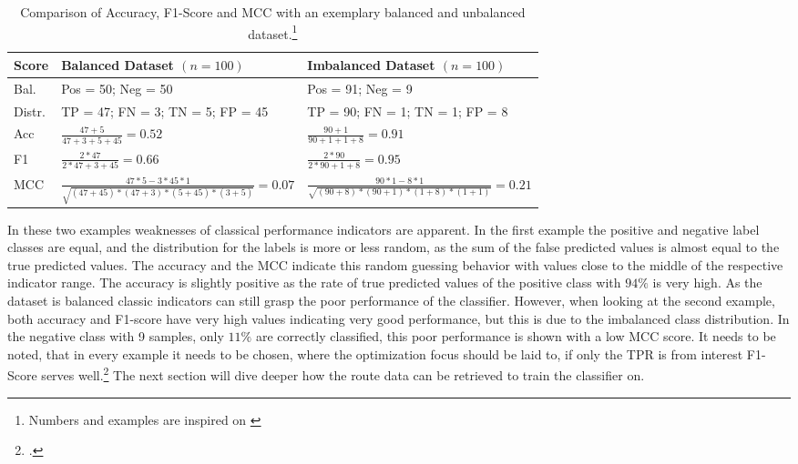 \begin{table}[ht]
    \centering
    \begin{tabular}{@{}P{0.1\textwidth}P{0.38\textwidth}P{0.38\textwidth}@{}}
        \toprule
        Score  & Balanced Dataset $(n = 100)$                                     & Imbalanced Dataset $(n = 100)$                               \\
        \midrule
        Bal.   & Pos = 50; Neg = 50                                               & Pos = 91; Neg = 9                                            \\
        \midrule
        Distr. & TP = 47; FN = 3; TN = 5; FP = 45                                 & TP = 90; FN = 1; TN = 1; FP = 8                              \\
        \midrule
        Acc    & $\frac{47 + 5}{47 + 3  + 5 + 45} = 0.52$                         & $\frac{90 + 1}{90 + 1  + 1 +8} = 0.91$                       \\
        \midrule
        F1     & $\frac{2* 47}{2*47 + 3 + 45} = 0.66$                             & $\frac{2 * 90}{2 * 90 + 1 +8} = 0.95$                        \\
        \midrule
        MCC    & $\frac{47*5 -3*45*1}{\sqrt{(47+45)*(47+3)*(5+45)*(3+5)}} = 0.07$ & $\frac{90*1 - 8*1}{\sqrt{(90+8)*(90+1)*(1+8)*(1+1)}} = 0.21$ \\
        \bottomrule
    \end{tabular}
    \caption[Comparison of Accuracy, F1-Score and MCC with an exemplary balanced and unbalanced
        dataset.]{Comparison of Accuracy, F1-Score and MCC with an exemplary balanced and unbalanced
        dataset.\footnote{Numbers and examples are inspired on \cite[p.9]{chicco_advantages_2020}}}
    \label{tab:indicator_comparison}
\end{table}
In these two examples weaknesses of classical performance indicators are apparent. In the first
example the positive and negative label classes are equal, and the distribution for the
labels is more or less random, as the sum of the false predicted values is almost equal to
the true predicted values. The accuracy and the \gls{MCC} indicate this random guessing
behavior with values close to the middle of the respective indicator range.
The accuracy is slightly positive as the rate of true predicted values of the positive class
with $94\%$ is very high. As the dataset is balanced classic indicators can still grasp
the poor performance of the classifier. However, when looking at the second example, both
accuracy and F1-score have very high values indicating very good performance, but this is
due to the imbalanced class distribution. In the negative class with 9 samples, only $11\%$
are correctly classified, this poor performance is shown with a low \gls{MCC} score. It needs
to be noted, that in every example it needs to be chosen, where the optimization focus should
be laid to, if only the \gls{TPR} is from interest F1-Score serves well.\footcite[cf.][p.8f.]{chicco_advantages_2020}
The next section will dive deeper how the route data can be retrieved to train the classifier on.

